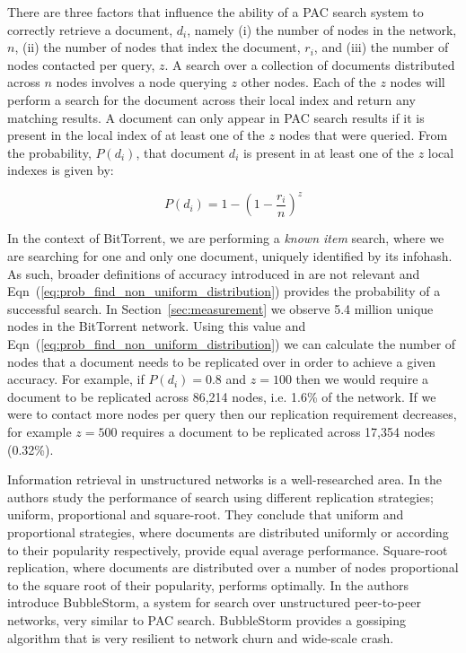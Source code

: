     There are three factors that influence the ability of a PAC search system to correctly retrieve a document, $d_i$, namely (i) the number of nodes in the network, $n$, (ii) the number of nodes that index the document, $r_i$, and (iii) the number of nodes contacted per query, $z$. A search over a collection of documents distributed across $n$ nodes involves a node querying $z$ other nodes. Each of the $z$ nodes will perform a search for the document across their local index and return any matching results. A document can only appear in PAC search results if it is present in the local index of at least one of the $z$ nodes that were queried. From \cite{Cox2009} the probability, $P(d_i)$, that document $d_i$ is present in at least one of the $z$ local indexes is given by:
    
    \begin{equation}
        P(d_i) = 1 - (1-\frac{r_i}{n})^{z}
        \label{eq:prob_find_non_uniform_distribution}
    \end{equation}

    In the context of BitTorrent, we are performing a \emph{known item} search, where we are searching for one and only one document, uniquely identified by its infohash. As such, broader definitions of accuracy introduced in \cite{Asthana2011,Cox} are not relevant and Eqn~(\ref{eq:prob_find_non_uniform_distribution}) provides the probability of a successful search. In Section~\ref{sec:measurement} we observe 5.4 million unique nodes in the BitTorrent network. Using this value and Eqn~(\ref{eq:prob_find_non_uniform_distribution}) we can calculate the number of nodes that a document needs to be replicated over in order to achieve a given accuracy. For example, if $P(d_i)=0.8$ and $z=100$ then we would require a document to be replicated across 86,214 nodes, i.e. 1.6\% of the network. If we were to contact more nodes per query then our replication requirement decreases, for example $z=500$ requires a document to be replicated across 17,354 nodes (0.32\%).

    Information retrieval in unstructured networks is a well-researched area. In \cite{Cohen2002} the authors study the performance of search using different replication strategies; uniform, proportional and square-root. They conclude that uniform and proportional strategies, where documents are distributed uniformly or according to their popularity respectively, provide equal average performance. Square-root replication, where documents are distributed over a number of nodes proportional to the square root of their popularity, performs optimally. In \cite{Terpstra} the authors introduce BubbleStorm, a system for search over unstructured peer-to-peer networks, very similar to PAC search. BubbleStorm provides a gossiping algorithm that is very resilient to network churn and wide-scale crash. 

